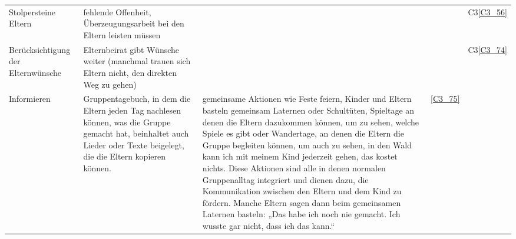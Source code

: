\begin{landscape}
\begin{small}
\begin{centering}
\begin{longtable}{p{2cm}p{11cm}p{3cm}p{3cm}p{2cm}}
Stolpersteine Eltern & fehlende Offenheit, Überzeugungsarbeit bei den Eltern leisten müssen & & & C3\ref{C3_56}
\\  


Berücksichtigung der Elternwünsche & Elternbeirat gibt Wünsche weiter (manchmal trauen sich Eltern nicht, den direkten Weg zu gehen) & & &  C3\ref{C3_74}\\

Informieren & Gruppentagebuch, in dem die Eltern jeden Tag nachlesen können, was die Gruppe gemacht hat, beinhaltet auch Lieder oder Texte beigelegt, die die Eltern kopieren können. &
gemeinsame Aktionen wie Feste feiern, Kinder und Eltern basteln gemeinsam Laternen oder Schultüten, Spieltage an denen die Eltern dazukommen können, um zu sehen, welche Spiele es gibt oder Wandertage, an denen die Eltern die Gruppe begleiten können, um auch zu sehen, in den Wald kann ich mit meinem Kind jederzeit gehen, das kostet nichts. Diese Aktionen sind alle in denen normalen Gruppenalltag integriert und dienen dazu, die Kommunikation zwischen den Eltern und dem Kind zu fördern. Manche Eltern sagen dann beim gemeinsamen Laternen basteln: „Das habe ich noch nie gemacht. Ich wusste gar nicht, dass ich das kann.“&\ref{C3_75}
\\ 

\end{longtable}
\end{centering} 


\end{small}
\end{landscape}
